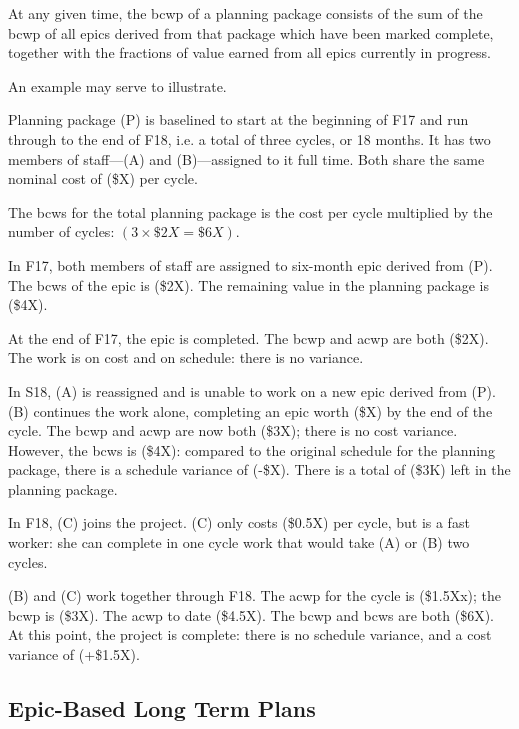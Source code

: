 At any given time, the \gls{bcwp} of a planning package consists of the sum of the \gls{bcwp} of all \glspl{epic} derived from that package which have been marked complete, together with the fractions of value earned from all \glspl{epic} currently in progress.

An example may serve to illustrate.

Planning package (P) is baselined to start at the beginning of F17 and run through to the end of F18, i.e. a total of three \glspl{cycle}, or 18 months. It has two members of staff---(A) and (B)---assigned to it full time.
Both share the same nominal cost of (\$X) per \gls{cycle}.

The \gls{bcws} for the total planning package is the cost per \gls{cycle} multiplied by the number of \glspl{cycle}: $(3 \times \$2X = \$6X)$.

In F17, both members of staff are assigned to six-month \gls{epic} derived from (P).
The \gls{bcws} of the \gls{epic} is (\$2X).
The remaining value in the planning package is (\$4X).

At the end of F17, the \gls{epic} is completed.
The \gls{bcwp} and \gls{acwp} are both (\$2X).
The work is on cost and on schedule: there is no variance.

In S18, (A) is reassigned and is unable to work on a new \gls{epic} derived from (P).
(B) continues the work alone, completing an \gls{epic} worth (\$X) by the end of the \gls{cycle}.
The \gls{bcwp} and \gls{acwp} are now both (\$3X); there is no cost variance.
However, the \gls{bcws} is (\$4X): compared to the original schedule for the planning package, there is a schedule variance of (-\$X).
There is a total of (\$3K) left in the planning package.

In F18, (C) joins the project.
(C) only costs (\$0.5X) per \gls{cycle}, but is a fast worker: she can complete in one \gls{cycle} work that would take (A) or (B) two \glspl{cycle}.

(B) and (C) work together through F18.
The \gls{acwp} for the \gls{cycle} is (\$1.5Xx); the \gls{bcwp} is (\$3X). The \gls{acwp} to date (\$4.5X).
The \gls{bcwp} and \gls{bcws} are both (\$6X).
At this point, the project is complete: there is no schedule variance, and a cost variance of (+\$1.5X).

\subsection{Epic-Based Long Term Plans}

